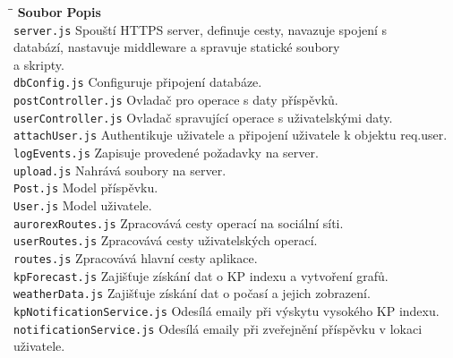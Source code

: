 \begin{tabbing}
\hspace{5cm}\=\hspace{6.5cm}\=\kill
\textbf{Soubor} \> \textbf{Popis} \\[10pt]
\texttt{server.js} \> Spouští HTTPS server, definuje cesty, navazuje spojení s \\
                   \> databází, nastavuje middleware a spravuje statické soubory \\
                   \> a skripty. \\ [10pt]
\texttt{dbConfig.js} \> Configuruje připojení databáze. \\[10pt]
\texttt{postController.js} \> Ovladač pro operace s daty příspěvků. \\[10pt]
\texttt{userController.js} \> Ovladač spravující operace s uživatelskými daty. \\[10pt]
\texttt{attachUser.js} \> Authentikuje uživatele a připojení uživatele k objektu req.user. \\[10pt]
\texttt{logEvents.js} \> Zapisuje provedené požadavky na server. \\[10pt]
\texttt{upload.js} \> Nahrává soubory na server. \\[10pt]
\texttt{Post.js} \> Model příspěvku. \\[10pt]
\texttt{User.js} \> Model uživatele. \\[10pt]
\texttt{aurorexRoutes.js} \> Zpracovává cesty operací na sociální síti. \\[10pt]
\texttt{userRoutes.js} \> Zpracovává cesty uživatelských operací. \\[10pt]
\texttt{routes.js} \> Zpracovává hlavní cesty aplikace. \\[10pt]
\texttt{kpForecast.js} \> Zajišťuje získání dat o KP indexu a vytvoření grafů. \\[10pt]
\texttt{weatherData.js} \> Zajišťuje získání dat o počasí a jejich zobrazení. \\[10pt]
\texttt{kpNotificationService.js} \> Odesílá emaily při výskytu vysokého KP indexu. \\[10pt]
\texttt{notificationService.js} \> Odesílá emaily při zveřejnění příspěvku v lokaci uživatele. \\[10pt]
\end{tabbing}




